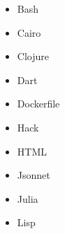 \documentclass[preview]{standalone}
\begin{document}
\begin{center}
\begin{itemize}
                                \item Bash
                                \item Cairo
                                \item Clojure
                                \item Dart
                                \item Dockerfile
                                \item Hack
                                \item HTML
                                \item Jsonnet
                                \item Julia
                                \item Lisp
                            \end{itemize}
\end{center}
\end{document}
